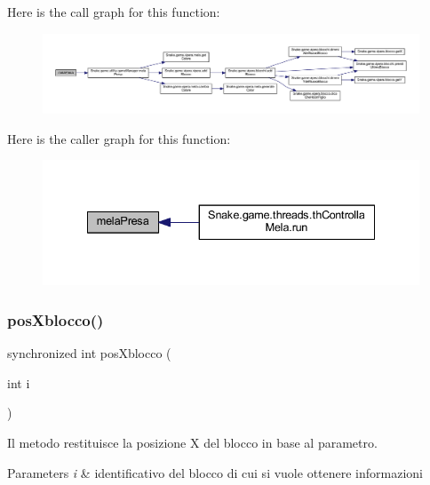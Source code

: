 Here is the call graph for this function\+:
\nopagebreak
\begin{figure}[H]
\begin{center}
\leavevmode
\includegraphics[width=350pt]{class_snake_1_1game_1_1gioco_ab565cb1ea4ead20f825d28b7e78ec5c8_cgraph}
\end{center}
\end{figure}
Here is the caller graph for this function\+:
\nopagebreak
\begin{figure}[H]
\begin{center}
\leavevmode
\includegraphics[width=335pt]{class_snake_1_1game_1_1gioco_ab565cb1ea4ead20f825d28b7e78ec5c8_icgraph}
\end{center}
\end{figure}
\mbox{\label{class_snake_1_1game_1_1gioco_adaf82eb9ab0c17af1f56016eff67aa1d}} 
\subsubsection{\texorpdfstring{pos\+Xblocco()}{posXblocco()}}
{\footnotesize\ttfamily synchronized int pos\+Xblocco (\begin{DoxyParamCaption}\item[{int}]{i }\end{DoxyParamCaption})}



Il metodo restituisce la posizione X del blocco in base al parametro. 


\begin{DoxyParams}{Parameters}
{\em i} & identificativo del blocco di cui si vuole ottenere informazioni \\
\hline
\end{DoxyParams}


